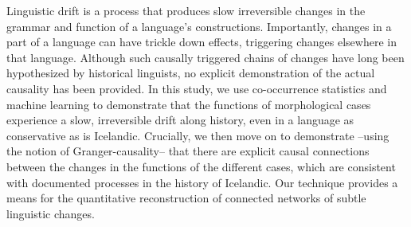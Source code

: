 Linguistic drift is a process that produces slow irreversible changes in the grammar and function of a language's constructions.  Importantly, changes in a part of a language can have trickle down effects, triggering changes elsewhere in that language. Although such causally triggered chains of changes have long been hypothesized by historical linguists, no explicit demonstration of the actual causality has been provided. In this study, we use co-occurrence statistics and machine learning to demonstrate that the functions of morphological cases experience a slow, irreversible drift along history, even in a language as conservative as is Icelandic. Crucially, we then move on to demonstrate --using the notion of Granger-causality-- that there are explicit causal connections between the changes in the functions of the different cases, which are consistent with documented processes in the history of Icelandic. Our technique provides a means for the quantitative reconstruction of connected networks of subtle linguistic changes.

